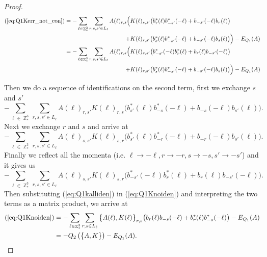 \documentclass[sn-mathphys, Numbered ,a4paper]{sn-jnl}%
\DeclareMathOperator{\Z}{\mathbb{Z}}
\theoremstyle{plain}
\theoremstyle{definition}
\theoremstyle{remark}
\theoremstyle{plain}
\theoremstyle{definition}
\theoremstyle{remark}
\begin{document}
\begin{proof}
\begin{align}
    (\ref{eq:Q1Kerr_not_con}) = -\sum\limits_{\ell \in \Z^3_*}\sum\limits_{r,s,s' \in L_{\ell}}A(\ell)_{r,s}
        \Big(&K(\ell)_{s,s'}\big(b^*_{r}(\ell)b^*_{-s'}(-\ell)+b_{-s'}(-\ell)b_{r}(\ell)\big)\nonumber\\ + &K(\ell)_{r,s'}\big(b^*_{s}(\ell)b^*_{-s'}(-\ell) +b_{-s'}(-\ell)b_{s}(\ell) \big)\Big) - E_{Q_1}(A)\nonumber\\
        =-\sum\limits_{\ell \in \Z^3_*}\sum\limits_{r,s,s' \in L_{\ell}}A(\ell)_{r,s}
        \Big(&K(\ell)_{s,s'}\big(b^*_{-s'}(-\ell)b^*_{r}(\ell)+b_{r}(\ell)b_{-s'}(-\ell)\big)\nonumber\\ + &K(\ell)_{r,s'}\big(b^*_{s}(\ell)b^*_{-s'}(-\ell) +b_{-s'}(-\ell)b_{s}(\ell) \big)\Big) - E_{Q_1}(A)\label{eq:Q1Knoiden}
\end{align}

Then we do a sequence of identifications on the second term, first we exchange $s$ and $s'$ 
\begin{equation}
    -\sum\limits_{\ell \in \Z^3_*}\sum\limits_{r,s,s' \in L_{\ell}}A(\ell)_{r,s'}K(\ell)_{r,s}\big(b^*_{s'}(\ell)b^*_{-s}(-\ell)+b_{-s}(-\ell)b_{s'}(\ell) \big).
\end{equation}
Next we exchange $r$ and $s$ and arrive at
\begin{equation}
    -\sum\limits_{\ell \in \Z^3_*}\sum\limits_{r,s,s' \in L_{\ell}}A(\ell)_{s,s'}K(\ell)_{s,r}\big(b^*_{s'}(\ell)b^*_{-r}(-\ell) +b_{-r}(-\ell)b_{s'}(\ell)\big).
\end{equation}
Finally we reflect all the momenta (i.e. $\ell\rightarrow -\ell,r\rightarrow -r,s\rightarrow -s,s'\rightarrow -s'$) and it gives us
\begin{equation}\label{eq:Q1kalliden}
    -\sum\limits_{\ell \in \Z^3_*}\sum\limits_{r,s,s' \in L_{\ell}}A(\ell)_{s,s'}K(\ell)_{s,r}\big(b^*_{-s'}(-\ell)b^*_{r}(\ell) +b_{r}(\ell)b_{-s'}(-\ell)\big).
\end{equation}
Then substituting (\ref{eq:Q1kalliden}) in (\ref{eq:Q1Knoiden}) and interpreting the two terms as a matrix product, we arrive at
\begin{align}
    (\ref{eq:Q1Knoiden}) &= -\sum\limits_{\ell \in \Z^3_*}\sum\limits_{r,s \in L_{\ell}}\big\{A(\ell), K(\ell)\big\}_{r,s}\big(b_{r}(\ell)b_{-s}(-\ell)+b^*_{r}(\ell)b^*_{-s}(-\ell)  \big) - E_{Q_1}(A)\\
    &= -Q_2\left(\big\{A, K\big\}\right) - E_{Q_1}(A).
\end{align}
\end{proof}
\end{document}
